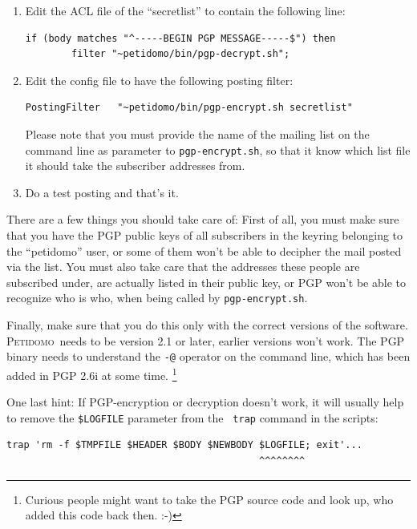 \documentclass[a4paper]{report}
\newcommand{\Petidomo}{{\scshape Peti\-domo}}
\newcommand{\file}[1]{{\tt #1}}
\begin{document}
\begin{enumerate}
\item Edit the ACL file of the ``secretlist'' to contain the following
line:

\begin{verbatim}
if (body matches "^-----BEGIN PGP MESSAGE-----$") then
        filter "~petidomo/bin/pgp-decrypt.sh";
\end{verbatim}

\item Edit the config file to have the following posting filter:

\begin{verbatim}
PostingFilter   "~petidomo/bin/pgp-encrypt.sh secretlist"
\end{verbatim}

Please note that you must provide the name of the mailing list on the
command line as parameter to \file{pgp-encrypt.sh}, so that it know
which list file it should take the subscriber addresses from.

\item Do a test posting and that's it.

\end{enumerate}

There are a few things you should take care of: First of all, you must
make sure that you have the PGP public keys of all subscribers in the
keyring belonging to the ``petidomo'' user, or some of them won't be
able to decipher the mail posted via the list. You must also take care
that the addresses these people are subscribed under, are actually
listed in their public key, or PGP won't be able to recognize who is
who, when being called by \file{pgp-encrypt.sh}.

Finally, make sure that you do this only with the correct versions of
the software. \Petidomo\ needs to be version 2.1 or later, earlier
versions won't work. The PGP binary needs to understand the {\tt -@}
operator on the command line, which has been added in PGP 2.6i at some
time. \footnote{Curious people might want to take the PGP source code
and look up, who added this code back then. :-)}

One last hint: If PGP-encryption or decryption doesn't work, it will
usually help to remove the {\tt \$LOGFILE} parameter from the {\tt
trap} command in the scripts:

\begin{verbatim}
trap 'rm -f $TMPFILE $HEADER $BODY $NEWBODY $LOGFILE; exit'...
                                            ^^^^^^^^
\end{verbatim}
\end{document}
